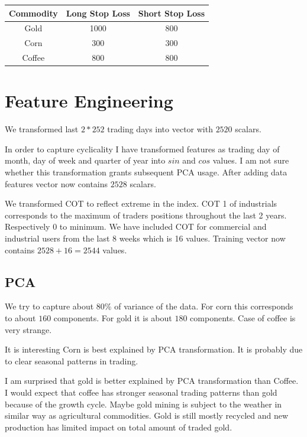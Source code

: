 \documentclass[final,2p]{elsarticle}
\begin{document}
\begin{center}
\begin{tabular}{|c|c|c|}
    \hline
    Commodity & Long Stop Loss & Short Stop Loss \\
    \hline
    Gold & 1000 & 800 \\
    Corn & 300 & 300 \\
    Coffee & 800 & 800 \\
    \hline
\end{tabular}
\end{center}

\clearpage

\section{Feature Engineering}

We transformed last $2*252$ trading days into vector with $2520$ scalars.

In order to capture cyclicality I have transformed features as trading day of month, day of week and quarter of year into $sin$ and $cos$ values.
I am not sure whether this transformation grants subsequent PCA usage.
After adding data features vector now contains $2528$ scalars.

We transformed COT to reflect extreme in the index. COT 1 of industrials corresponds to the maximum of traders positions throughout the last 2 years.
Respectively 0 to minimum. We have included COT for commercial and industrial users from the last 8 weeks which is 16 values.
Training vector now contains $2528+16=2544$ values.

\subsection{PCA}
We try to capture about 80\% of variance of the data. For corn this corresponds to about $160$ components. For gold it is about $180$ components.
Case of coffee is very strange.

It is interesting Corn is best explained by PCA transformation. It is probably due to clear seasonal patterns in trading.

I am surprised that gold is better explained by PCA transformation than Coffee. I would expect that coffee has stronger seasonal trading patterns than gold because of the growth cycle. Maybe gold mining is subject to the weather in similar way as agricultural commodities. Gold is still mostly recycled and new production has limited impact on total amount of traded gold.
\end{document}
